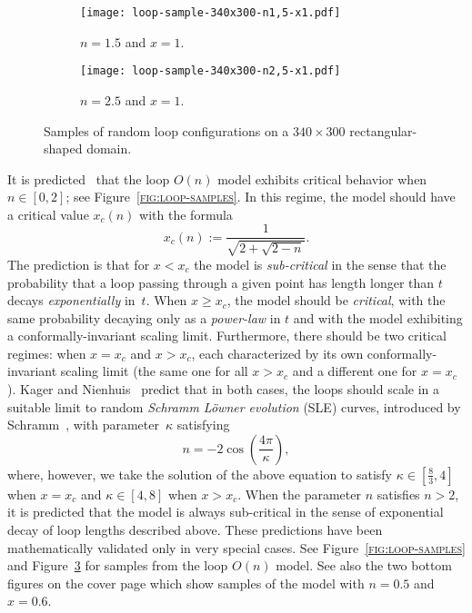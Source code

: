\documentclass[12pt,reqno]{article}
\newcommand{\reffig}[1] {\textsc{\ref{#1}}}
\begin{document}
\begin{figure}[!ht]
	\centering
	\begin{subfigure}[t]{.49\textwidth}
		\texttt{[image: loop-sample-340x300-n1,5-x1.pdf]}
		\caption{$n=1.5$ and $x=1$.}
		\label{fig:loop-sample-n1,5-x1}
	\end{subfigure}%
	\begin{subfigure}{10pt}
		\quad
	\end{subfigure}%
	\begin{subfigure}[t]{.49\textwidth}
		\texttt{[image: loop-sample-340x300-n2,5-x1.pdf]}
		\caption{$n=2.5$ and $x=1$.}
		\label{fig:loop-sample-n2,5-x1}
	\end{subfigure}
	\caption{Samples of random loop configurations on a $340\times300$ rectangular-shaped domain.}
	\label{fig:loop-samples-large-scale}
\end{figure}

It is predicted~\cite{Nie82,KagNie04,Smi06} that the loop $O(n)$ model exhibits critical behavior when $n\in [0,2]$; see Figure~\reffig{fig:loop-samples}. In this regime, the model should have a critical value $x_c(n)$ with the formula
\begin{equation}\label{eq:x c def}
  x_c(n) := \frac{1}{\sqrt{2 + \sqrt{2 - n}}}.
\end{equation}
The prediction is that for $x<x_c$ the model is \emph{sub-critical} in the sense that the probability that a loop passing through a given point has length longer than $t$ decays \emph{exponentially} in~$t$. When $x\ge x_c$, the model should be \emph{critical}, with the same probability decaying only as a \emph{power-law} in $t$ and with the model exhibiting a conformally-invariant scaling limit. Furthermore, there should be two critical regimes: when $x = x_c$ and $x>x_c$, each characterized by its own conformally-invariant scaling limit (the same one for all $x>x_c$ and a different one for $x = x_c$). Kager and Nienhuis~\cite[Section 5.6]{KagNie04} predict that in both cases, the loops should scale in a suitable limit to random \emph{Schramm L\"owner evolution} (SLE) curves, introduced by Schramm~\cite{Sch00}, with parameter~$\kappa$ satisfying
\begin{equation}\label{eq:kappa and n relation}
  n = -2\cos\left(\frac{4\pi}{\kappa}\right),
\end{equation}
where, however, we take the solution of the above equation to
satisfy $\kappa\in [\frac{8}{3},4]$ when $x=x_c$ and
$\kappa\in[4,8]$ when $x>x_c$. When the parameter $n$ satisfies
$n>2$, it is predicted that the model is always sub-critical in the
sense of exponential decay of loop lengths described above. These predictions have been mathematically validated only in very special cases. See Figure~\reffig{fig:loop-samples} and Figure~\reffig{fig:loop-samples-large-scale} for samples from the loop $O(n)$ model. See also the two bottom figures on the cover page which show samples of the model with $n=0.5$ and $x=0.6$.
\end{document}
